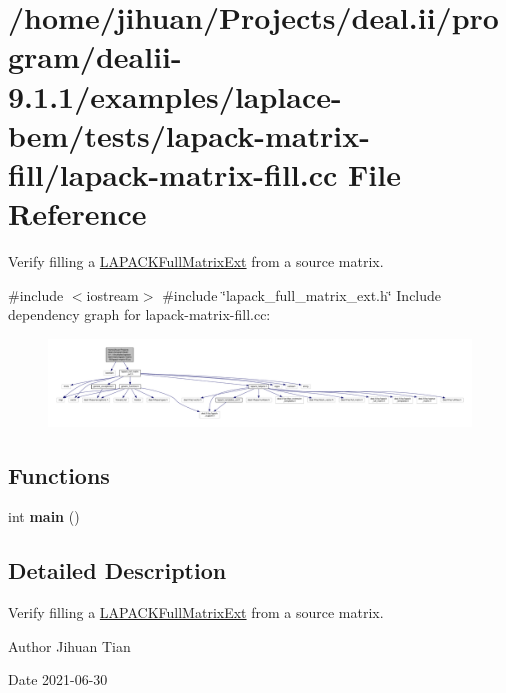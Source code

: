 \hypertarget{lapack-matrix-fill_8cc}{}\section{/home/jihuan/\+Projects/deal.ii/program/dealii-\/9.1.1/examples/laplace-\/bem/tests/lapack-\/matrix-\/fill/lapack-\/matrix-\/fill.cc File Reference}
\label{lapack-matrix-fill_8cc}


Verify filling a \hyperlink{classLAPACKFullMatrixExt}{L\+A\+P\+A\+C\+K\+Full\+Matrix\+Ext} from a source matrix.  


{\ttfamily \#include $<$iostream$>$}\newline
{\ttfamily \#include \char`\"{}lapack\+\_\+full\+\_\+matrix\+\_\+ext.\+h\char`\"{}}\newline
Include dependency graph for lapack-\/matrix-\/fill.cc\+:
\nopagebreak
\begin{figure}[H]
\begin{center}
\leavevmode
\includegraphics[width=350pt]{lapack-matrix-fill_8cc__incl}
\end{center}
\end{figure}
\subsection*{Functions}
\begin{DoxyCompactItemize}
\item 
\mbox{\label{lapack-matrix-fill_8cc_ae66f6b31b5ad750f1fe042a706a4e3d4}} 
int {\bfseries main} ()
\end{DoxyCompactItemize}


\subsection{Detailed Description}
Verify filling a \hyperlink{classLAPACKFullMatrixExt}{L\+A\+P\+A\+C\+K\+Full\+Matrix\+Ext} from a source matrix. 

\begin{DoxyAuthor}{Author}
Jihuan Tian 
\end{DoxyAuthor}
\begin{DoxyDate}{Date}
2021-\/06-\/30 
\end{DoxyDate}

